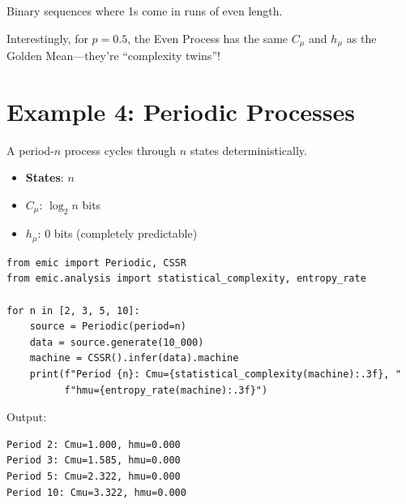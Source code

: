 \documentclass[11pt,a4paper]{article}
\theoremstyle{definition}
\theoremstyle{plain}
\newcommand{\Cmu}{C_\mu}
\newcommand{\hmu}{h_\mu}
\begin{document}
Binary sequences where 1s come in runs of even length.

\begin{center}
\end{center}

Interestingly, for $p = 0.5$, the Even Process has the same $\Cmu$ and $\hmu$ as the Golden Mean---they're ``complexity twins''!

\section{Example 4: Periodic Processes}
\label{sec:example-periodic}

A period-$n$ process cycles through $n$ states deterministically.

\begin{itemize}
    \item \textbf{States}: $n$
    \item \textbf{$\Cmu$}: $\log_2 n$ bits
    \item \textbf{$\hmu$}: 0 bits (completely predictable)
\end{itemize}

\begin{lstlisting}
from emic import Periodic, CSSR
from emic.analysis import statistical_complexity, entropy_rate

for n in [2, 3, 5, 10]:
    source = Periodic(period=n)
    data = source.generate(10_000)
    machine = CSSR().infer(data).machine
    print(f"Period {n}: Cmu={statistical_complexity(machine):.3f}, "
          f"hmu={entropy_rate(machine):.3f}")
\end{lstlisting}

Output:
\begin{verbatim}
Period 2: Cmu=1.000, hmu=0.000
Period 3: Cmu=1.585, hmu=0.000
Period 5: Cmu=2.322, hmu=0.000
Period 10: Cmu=3.322, hmu=0.000
\end{verbatim}
\end{document}
